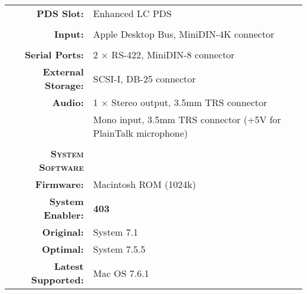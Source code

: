 \begin{tabular}{ r p{6in} }
\textbf{PDS Slot:} & Enhanced LC PDS \\
\\
\textbf{Input:} & Apple Desktop Bus, MiniDIN-4K connector \\
\\
\textbf{Serial Ports:} & 2 \(\times\) RS-422, MiniDIN-8 connector \\
\textbf{External Storage:} & SCSI-I, DB-25 connector \\
\textbf{Audio:} & 1 \(\times\) Stereo output, 3.5mm TRS connector \\
~ & Mono input, 3.5mm TRS connector (+5V for PlainTalk microphone) \\
\\
\textbf{\textsc{System Software}} & ~ \\
\textbf{Firmware:} & Macintosh ROM (1024k) \\
\textbf{System Enabler:} & \textbf{403} \\
\textbf{Original:} & System 7.1 \\
\textbf{Optimal:} & System 7.5.5 \\
\textbf{Latest Supported:} & Mac OS 7.6.1 \\
\end{tabular}